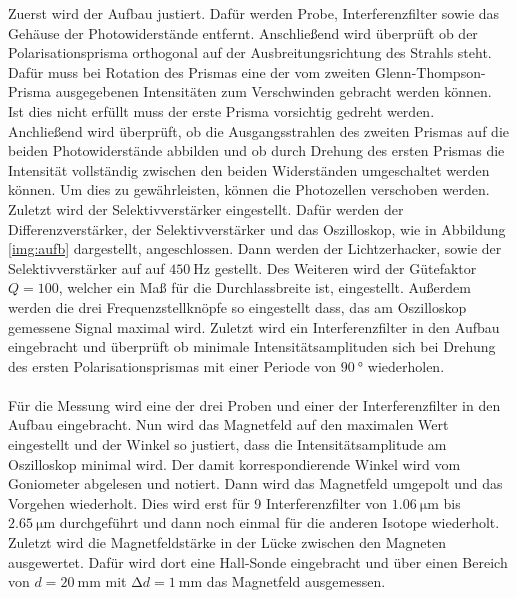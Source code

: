 \noindent
Zuerst wird der Aufbau justiert. Dafür werden Probe, Interferenzfilter sowie das Gehäuse der Photowiderstände entfernt.
Anschließend wird überprüft ob der Polarisationsprisma orthogonal auf der Ausbreitungsrichtung des Strahls steht.
Dafür muss bei Rotation des Prismas eine der vom zweiten Glenn-Thompson-Prisma ausgegebenen Intensitäten zum Verschwinden gebracht werden können.
Ist dies nicht erfüllt muss der erste Prisma vorsichtig gedreht werden.\\
Anchließend wird überprüft, ob die Ausgangsstrahlen des zweiten Prismas auf die beiden Photowiderstände abbilden und 
ob durch Drehung des ersten Prismas die Intensität vollständig zwischen den beiden Widerständen umgeschaltet werden können.
Um dies zu gewährleisten, können die Photozellen verschoben werden.\\
Zuletzt wird der Selektivverstärker eingestellt. 
Dafür werden der Differenzverstärker, der Selektivverstärker und das Oszilloskop, wie in Abbildung \ref{img:aufb} dargestellt, angeschlossen.
Dann werden der Lichtzerhacker, sowie der Selektivverstärker auf auf $\SI{450}{\hertz}$ gestellt. 
Des Weiteren wird der Gütefaktor $Q = 100$, welcher ein Maß für die Durchlassbreite ist, eingestellt. 
Außerdem werden die drei Frequenzstellknöpfe so eingestellt dass, das am Oszilloskop gemessene Signal maximal wird.
Zuletzt wird ein Interferenzfilter in den Aufbau eingebracht und überprüft ob minimale Intensitätsamplituden sich bei Drehung 
des ersten Polarisationsprismas mit einer Periode von $\SI{90}{\degree}$ wiederholen.\\\\

\noindent
Für die Messung wird eine der drei Proben und einer der Interferenzfilter in den Aufbau eingebracht.
Nun wird das Magnetfeld auf den maximalen Wert eingestellt und der Winkel so justiert, dass die Intensitätsamplitude am Oszilloskop minimal wird.
Der damit korrespondierende Winkel wird vom Goniometer abgelesen und notiert. Dann wird das Magnetfeld umgepolt und das Vorgehen wiederholt.
Dies wird erst für 9 Interferenzfilter von $\SI{1.06}{\micro\meter}$ bis $\SI{2.65}{\micro\meter}$ durchgeführt und dann noch einmal für die anderen Isotope wiederholt.\\
Zuletzt wird die Magnetfeldstärke in der Lücke zwischen den Magneten ausgewertet. 
Dafür wird dort eine Hall-Sonde eingebracht und über einen Bereich von $d = \SI{20}{\milli\metre}$ mit $\increment d = \SI{1}{\milli\metre}$ das Magnetfeld ausgemessen.